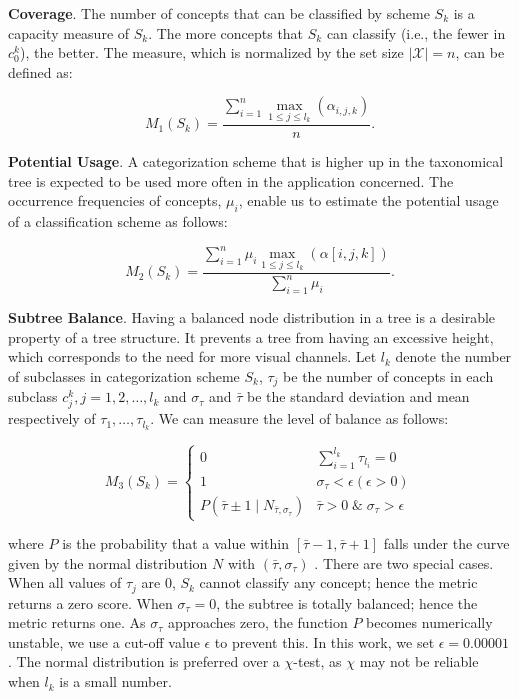 \textbf{Coverage}.
The number of concepts that can be classified by scheme $S_k$ is a capacity measure of $S_k$.
The more concepts that $S_k$ can classify (i.e., the fewer in $c^k_0$), the better.
The measure, which is normalized by the set size $\mid\!\mathcal{X}\!\!\mid=n$, can be defined as:

\begin{equation}
\label{eq:Coverage}
  M_1(S_k) = \frac{\sum_{i=1}^{n} \max_{1 \leq j \leq l_k} (\alpha_{i,j,k})}{n}.
\end {equation}

\textbf{Potential Usage}.
A categorization scheme that is higher up in the taxonomical tree is expected to be used more often in the application concerned.
The occurrence frequencies of concepts, $\mu_i$, enable us to estimate the potential usage of a classification scheme as follows:

\begin{equation}
\label{eq:Usage}
  M_2(S_k) = \frac{\sum_{i=1}^n \mu_i \max_{1 \leq j \leq l_k} (\alpha[i,j,k]) }
  {\sum_{i=1}^n \mu_i}.
\end {equation}

\textbf{Subtree Balance}.
Having a balanced node distribution in a tree is a desirable property of a tree structure.
It prevents a tree from having an excessive height, which corresponds to the need for more visual channels.
Let $l_k$ denote the number of subclasses in categorization scheme $S_k$,
$\tau_j$ be the number of concepts in each subclass $c^k_j, j=1, 2, \ldots, l_k$ and $\sigma_{\tau}$ and $\bar\tau$ be the standard deviation and mean respectively of $\tau_1, \ldots, \tau_{l_k}$.
We can measure the level of balance as follows:

\begin{equation}
\label{eq:Branch}
  M_3(S_k) = \begin{cases}
    0 & \sum_{i=1}^{l_{k}} \tau_{l_i} = 0 \\
    1 & \sigma_{\tau} < \epsilon (\epsilon \gt 0) \\
    P(\bar\tau \pm1 \mid N_{\bar\tau, \sigma_{\tau}}) & \bar\tau \gt 0 \; \& \;\sigma_{\tau} > \epsilon
  \end{cases}
\end {equation}

\noindent where $P$ is the probability that a value within $[\bar{\tau}-1, \bar{\tau}+1]$ falls under
the curve given by the normal distribution $N$ with $(\bar{\tau}, \sigma_\tau)$ \cite{patel96}.
There are two special cases.
When all values of $\tau_j$ are 0, $S_k$ cannot classify any concept; hence the metric returns a zero score.
When $\sigma_\tau = 0$, the subtree is totally balanced; hence the metric returns one.
As $\sigma_\tau$ approaches zero, the function $P$ becomes numerically unstable, we use a cut-off value $\epsilon$ to prevent this. In this work, we set $\epsilon = 0.00001$.
The normal distribution is preferred over a $\chi$-test, as $\chi$ may not be reliable when $l_k$ is a small number.

